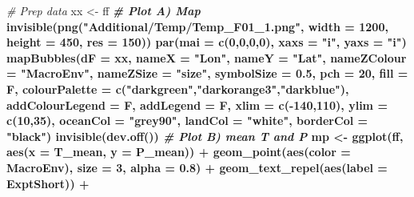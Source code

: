 \documentclass[
]{article}
\newenvironment{Shaded}{\begin{snugshade}}{\end{snugshade}}
\newcommand{\CommentTok}[1]{\textcolor[rgb]{0.56,0.35,0.01}{\textit{#1}}}
\newcommand{\DataTypeTok}[1]{\textcolor[rgb]{0.13,0.29,0.53}{#1}}
\newcommand{\DecValTok}[1]{\textcolor[rgb]{0.00,0.00,0.81}{#1}}
\newcommand{\FloatTok}[1]{\textcolor[rgb]{0.00,0.00,0.81}{#1}}
\newcommand{\KeywordTok}[1]{\textcolor[rgb]{0.13,0.29,0.53}{\textbf{#1}}}
\newcommand{\NormalTok}[1]{#1}
\newcommand{\OperatorTok}[1]{\textcolor[rgb]{0.81,0.36,0.00}{\textbf{#1}}}
\newcommand{\StringTok}[1]{\textcolor[rgb]{0.31,0.60,0.02}{#1}}
\begin{document}
\begin{Shaded}
\begin{Highlighting}[]
\CommentTok{# Prep data}
\NormalTok{xx <-}\StringTok{ }\NormalTok{ff }\OperatorTok{%
\CommentTok{# Plot A) Map}
\KeywordTok{invisible}\NormalTok{(}\KeywordTok{png}\NormalTok{(}\StringTok{"Additional/Temp/Temp_F01_1.png"}\NormalTok{, }\DataTypeTok{width =} \DecValTok{1200}\NormalTok{, }\DataTypeTok{height =} \DecValTok{450}\NormalTok{, }\DataTypeTok{res =} \DecValTok{150}\NormalTok{))}
\KeywordTok{par}\NormalTok{(}\DataTypeTok{mai =} \KeywordTok{c}\NormalTok{(}\DecValTok{0}\NormalTok{,}\DecValTok{0}\NormalTok{,}\DecValTok{0}\NormalTok{,}\DecValTok{0}\NormalTok{), }\DataTypeTok{xaxs =} \StringTok{"i"}\NormalTok{, }\DataTypeTok{yaxs =} \StringTok{"i"}\NormalTok{)}
\KeywordTok{mapBubbles}\NormalTok{(}\DataTypeTok{dF =}\NormalTok{ xx, }\DataTypeTok{nameX =} \StringTok{"Lon"}\NormalTok{, }\DataTypeTok{nameY =} \StringTok{"Lat"}\NormalTok{, }\DataTypeTok{nameZColour =} \StringTok{"MacroEnv"}\NormalTok{,}
           \DataTypeTok{nameZSize =} \StringTok{"size"}\NormalTok{, }\DataTypeTok{symbolSize =} \FloatTok{0.5}\NormalTok{, }\DataTypeTok{pch =} \DecValTok{20}\NormalTok{, }\DataTypeTok{fill =}\NormalTok{ F,}
           \DataTypeTok{colourPalette =} \KeywordTok{c}\NormalTok{(}\StringTok{"darkgreen"}\NormalTok{,}\StringTok{"darkorange3"}\NormalTok{,}\StringTok{"darkblue"}\NormalTok{), }\DataTypeTok{addColourLegend =}\NormalTok{ F, }\DataTypeTok{addLegend =}\NormalTok{ F,}
           \DataTypeTok{xlim =} \KeywordTok{c}\NormalTok{(}\OperatorTok{-}\DecValTok{140}\NormalTok{,}\DecValTok{110}\NormalTok{), }\DataTypeTok{ylim =} \KeywordTok{c}\NormalTok{(}\DecValTok{10}\NormalTok{,}\DecValTok{35}\NormalTok{),  }
           \DataTypeTok{oceanCol =} \StringTok{"grey90"}\NormalTok{, }\DataTypeTok{landCol =} \StringTok{"white"}\NormalTok{, }\DataTypeTok{borderCol =} \StringTok{"black"}\NormalTok{)}
\KeywordTok{invisible}\NormalTok{(}\KeywordTok{dev.off}\NormalTok{())}
\CommentTok{# Plot B) mean T and P}
\NormalTok{mp <-}\StringTok{ }\KeywordTok{ggplot}\NormalTok{(ff, }\KeywordTok{aes}\NormalTok{(}\DataTypeTok{x =}\NormalTok{ T_mean, }\DataTypeTok{y =}\NormalTok{ P_mean)) }\OperatorTok{+}\StringTok{ }
\StringTok{  }\KeywordTok{geom_point}\NormalTok{(}\KeywordTok{aes}\NormalTok{(}\DataTypeTok{color =}\NormalTok{ MacroEnv), }\DataTypeTok{size =} \DecValTok{3}\NormalTok{, }\DataTypeTok{alpha =} \FloatTok{0.8}\NormalTok{) }\OperatorTok{+}\StringTok{ }
\StringTok{  }\KeywordTok{geom_text_repel}\NormalTok{(}\KeywordTok{aes}\NormalTok{(}\DataTypeTok{label =}\NormalTok{ ExptShort)) }\OperatorTok{+}\StringTok{ }
}
\end{Highlighting}
\end{Shaded}
\end{document}
